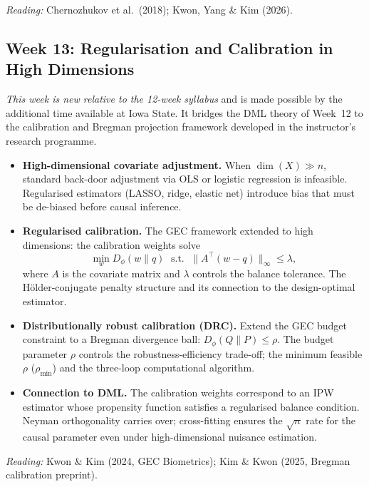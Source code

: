 \documentclass[12pt]{article}
\begin{document}
\noindent\textit{Reading:} Chernozhukov et al.\ (2018);
Kwon, Yang \& Kim (2026).

\subsection{Week 13: Regularisation and Calibration in High Dimensions}

\emph{This week is new relative to the 12-week syllabus} and is made
possible by the additional time available at Iowa State.  It bridges
the DML theory of Week~12 to the calibration and Bregman projection
framework developed in the instructor's research programme.

\begin{itemize}
  \item \textbf{High-dimensional covariate adjustment.}
    When $\dim(X) \gg n$, standard back-door adjustment via OLS or
    logistic regression is infeasible.  Regularised estimators
    (LASSO, ridge, elastic net) introduce bias that must be
    de-biased before causal inference.

  \item \textbf{Regularised calibration.}
    The GEC framework extended to high dimensions: the calibration
    weights solve
    \[
      \min_w D_\phi(w \| q)
      \;\text{ s.t. }\;
      \|A^\top(w - q)\|_\infty \leq \lambda,
    \]
    where $A$ is the covariate matrix and $\lambda$ controls the
    balance tolerance.  The H\"older-conjugate penalty structure
    and its connection to the design-optimal estimator.

  \item \textbf{Distributionally robust calibration (DRC).}
    Extend the GEC budget constraint to a Bregman divergence ball:
    $D_\phi(Q \| P) \leq \rho$.  The budget parameter $\rho$ controls
    the robustness-efficiency trade-off; the minimum feasible $\rho$
    ($\rho_{\min}$) and the three-loop computational algorithm.

  \item \textbf{Connection to DML.}
    The calibration weights correspond to an IPW estimator whose
    propensity function satisfies a regularised balance condition.
    Neyman orthogonality carries over; cross-fitting ensures the
    $\sqrt{n}$ rate for the causal parameter even under high-dimensional
    nuisance estimation.
\end{itemize}

\noindent\textit{Reading:} Kwon \& Kim (2024, GEC Biometrics);
Kim \& Kwon (2025, Bregman calibration preprint).
\end{document}
